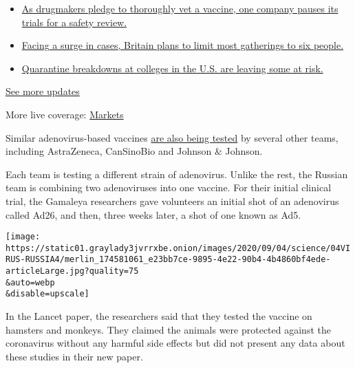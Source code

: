 \begin{itemize}
\tightlist
\item
  \href{https://www.nytimes3xbfgragh.onion/2020/09/09/world/covid-19-coronavirus.html?action=click\&pgtype=Article\&state=default\&region=MAIN_CONTENT_1\&context=storylines_live_updates\#link-70cea8bb}{As
  drugmakers pledge to thoroughly vet a vaccine, one company pauses its
  trials for a safety review.}
\item
  \href{https://www.nytimes3xbfgragh.onion/2020/09/09/world/covid-19-coronavirus.html?action=click\&pgtype=Article\&state=default\&region=MAIN_CONTENT_1\&context=storylines_live_updates\#link-4438dd7}{Facing
  a surge in cases, Britain plans to limit most gatherings to six
  people.}
\item
  \href{https://www.nytimes3xbfgragh.onion/2020/09/09/world/covid-19-coronavirus.html?action=click\&pgtype=Article\&state=default\&region=MAIN_CONTENT_1\&context=storylines_live_updates\#link-11cec4c0}{Quarantine
  breakdowns at colleges in the U.S. are leaving some at risk.}
\end{itemize}

\href{https://www.nytimes3xbfgragh.onion/2020/09/09/world/covid-19-coronavirus.html?action=click\&pgtype=Article\&state=default\&region=MAIN_CONTENT_1\&context=storylines_live_updates}{See
more updates}

More live coverage:
\href{https://www.nytimes3xbfgragh.onion/live/2020/09/08/business/stock-market-today-coronavirus?action=click\&pgtype=Article\&state=default\&region=MAIN_CONTENT_1\&context=storylines_live_updates}{Markets}

Similar adenovirus-based vaccines
\href{https://www.nytimes3xbfgragh.onion/interactive/2020/science/coronavirus-vaccine-tracker.html}{are
also being tested} by several other teams, including AstraZeneca,
CanSinoBio and Johnson \& Johnson.

Each team is testing a different strain of adenovirus. Unlike the rest,
the Russian team is combining two adenoviruses into one vaccine. For
their initial clinical trial, the Gamaleya researchers gave volunteers
an initial shot of an adenovirus called Ad26, and then, three weeks
later, a shot of one known as Ad5.

\texttt{[image: https://static01.graylady3jvrrxbe.onion/images/2020/09/04/science/04VIRUS-RUSSIA4/merlin\_174581061\_e23bb7ce-9895-4e22-90b4-4b4860bf4ede-articleLarge.jpg?quality=75\\\&auto=webp\\\&disable=upscale]}

In the Lancet paper, the researchers said that they tested the vaccine
on hamsters and monkeys. They claimed the animals were protected against
the coronavirus without any harmful side effects but did not present any
data about these studies in their new paper.

